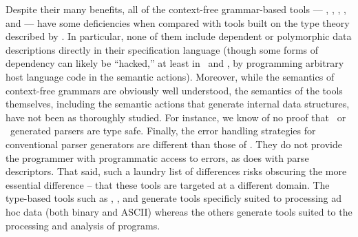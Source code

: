 Despite their many benefits, 
all of the context-free grammar-based tools --- \lex{}, \yacc, 
\antlr, \sablecc, and \demeter{} --- have some deficiencies when compared with
tools built on the type theory described by \ddc. 
In particular, none of them include dependent or 
polymorphic data descriptions directly in their specification language
(though some forms of dependency can likely be ``hacked,'' at least in
\lex\ and \yacc, by programming arbitrary host language 
code in the semantic actions).  Moreover, while the semantics of
context-free grammars are obviously well understood, the semantics of the
tools themselves, including the semantic actions that generate 
internal data structures, have not been as thoroughly studied.
For instance, we know of no proof that \antlr\ or \sablecc\ 
generated parsers are type safe.
Finally, the error handling strategies for conventional
parser generators are different than
those of \padsml{}.  They do not provide the programmer with
programmatic access to errors, as \padsml{} does with parse
descriptors.  That said, such a laundry list of differences risks
obscuring the more essential difference -- that these tools are
targeted at a different domain. The type-based tools such as
\pads{}, \datascript{}, and \packettypes{} generate tools
specificly suited to processing ad hoc data (both binary and ASCII) 
whereas the others generate tools suited to the processing and
analysis of programs.



